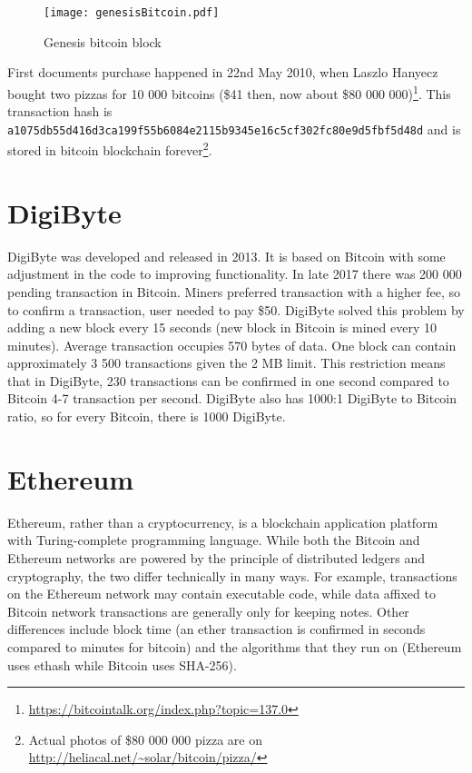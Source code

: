 \begin{figure}[h]
    \centering
    \texttt{[image: genesisBitcoin.pdf]}
    \caption{Genesis bitcoin block}
    \label{genesisBitcoin}
\end{figure}

First documents purchase happened in 22nd May 2010, when Laszlo Hanyecz bought two pizzas for 10 000 bitcoins (\$41 then, now about \$80 000 000)\footnote{\url{https://bitcointalk.org/index.php?topic=137.0}}. This transaction hash is \texttt{a1075db55d416d3ca199f55b6084e\-2115b9345e16c5cf302fc80e9d5fbf5d48d} and is stored in bitcoin blockchain forever\footnote{Actual photos of \$80 000 000 pizza are on \url{http://heliacal.net/~solar/bitcoin/pizza/}}.


\section{DigiByte}
DigiByte was developed and released in 2013. It is based on Bitcoin with some adjustment in the code to improving functionality. In late 2017 there was 200 000 pending transaction in Bitcoin. Miners preferred transaction with a higher fee, so to confirm a transaction, user needed to pay \$50. DigiByte solved this problem by adding a new block every 15 seconds (new block in Bitcoin is mined every 10 minutes). Average transaction occupies 570 bytes of data. One block can contain approximately 3 500 transactions given the 2 MB limit. This restriction means that in DigiByte, 230 transactions can be confirmed in one second compared to Bitcoin 4-7 transaction per second. DigiByte also has 1000:1 DigiByte to Bitcoin ratio, so for every Bitcoin, there is 1000 DigiByte. \cite{digibyteBook} \cite{dascano2018digibyte}


\section{Ethereum}
Ethereum, rather than a cryptocurrency, is a blockchain application platform with Turing-complete programming language. While both the Bitcoin and Ethereum networks are powered by the principle of distributed ledgers and cryptography, the two differ technically in many ways. For example, transactions on the Ethereum network may contain executable code, while data affixed to Bitcoin network transactions are generally only for keeping notes. Other differences include block time (an ether transaction is confirmed in seconds compared to minutes for bitcoin) and the algorithms that they run on (Ethereum uses ethash while Bitcoin uses SHA-256). \cite{wood2014ethereum}\cite{buterin2014next}



